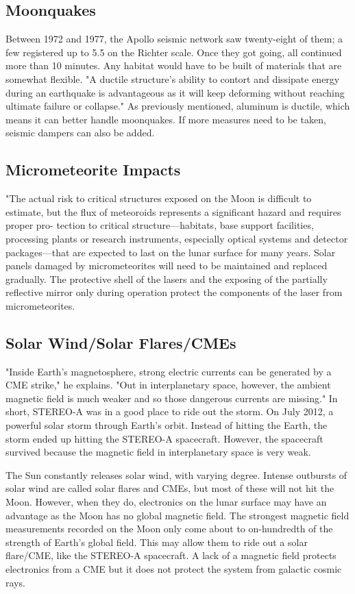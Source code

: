 \documentclass{aa}
\begin{document}
\subsection {Moonquakes}
Between 1972 and 1977, the Apollo seismic network saw twenty-eight of them; a few registered up to 5.5 on the Richter scale. Once they got going, all continued more than 10 minutes. Any habitat would have to be built of materials that are somewhat flexible. "A ductile structure's ability to contort and dissipate energy during an earthquake is advantageous as it will keep deforming without reaching ultimate failure or collapse." As previously mentioned, aluminum is ductile, which means it can better handle moonquakes. If more measures need to be taken, seismic dampers can also be added.  

\subsection {Micrometeorite Impacts}
"The actual risk to critical structures exposed on the
Moon is difficult to estimate, but the flux of meteoroids
represents a significant hazard and requires proper pro-
tection to critical structure—habitats, base support facilities, processing plants or research instruments, especially optical systems and detector packages—that are expected to last on the lunar surface for many years. Solar panels damaged by micrometeorites will need to be maintained and replaced gradually. The protective shell of the lasers and the exposing of the partially reflective mirror only during operation protect the components of the laser from micrometeorites.

\subsection {Solar Wind/Solar Flares/CMEs}
"Inside Earth's magnetosphere, strong electric currents can be generated by a CME strike," he explains. "Out in interplanetary space, however, the ambient magnetic field is much weaker and so those dangerous currents are missing."  In short, STEREO-A was in a good place to ride out the storm.
On July 2012, a powerful solar storm through Earth's orbit. Instead of hitting the Earth, the storm ended up hitting the STEREO-A spacecraft. However, the spacecraft survived because the magnetic field in interplanetary space is very weak. 

The Sun constantly releases solar wind, with varying degree. Intense outbursts of solar wind are called solar flares and CMEs, but most of these will not hit the Moon. However, when they do, electronics on the lunar surface may have an advantage as the Moon has no global magnetic field. The strongest magnetic field measurements recorded on the Moon only come about to on-hundredth of the strength of Earth's global field. This may allow them to ride out a solar flare/CME, like the STEREO-A spacecraft. A lack of a magnetic field protects electronics from a CME but it does not protect the system from galactic cosmic rays.
\end{document}
